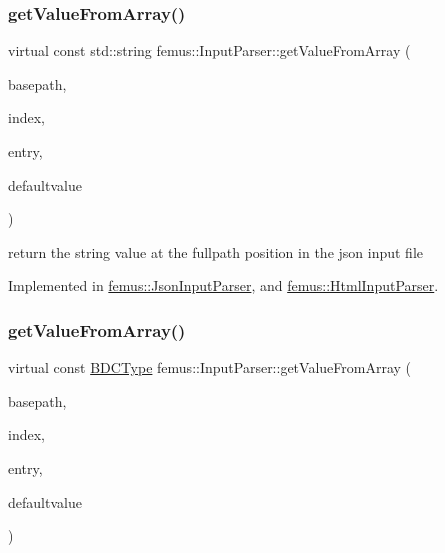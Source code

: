 \subsubsection{\texorpdfstring{get\+Value\+From\+Array()}{getValueFromArray()}\hspace{0.1cm}{\footnotesize\ttfamily [1/2]}}
{\footnotesize\ttfamily virtual const std\+::string femus\+::\+Input\+Parser\+::get\+Value\+From\+Array (\begin{DoxyParamCaption}\item[{const std\+::string \&}]{basepath,  }\item[{const unsigned int}]{index,  }\item[{const std\+::string}]{entry,  }\item[{const std\+::string}]{defaultvalue }\end{DoxyParamCaption})\hspace{0.3cm}{\ttfamily [pure virtual]}}

return the string value at the {\ttfamily fullpath} position in the json input file 

Implemented in \mbox{\hyperlink{classfemus_1_1_json_input_parser_a857a85ac2a5e12c433a143762b01d1e8}{femus\+::\+Json\+Input\+Parser}}, and \mbox{\hyperlink{classfemus_1_1_html_input_parser_a6ea19a89092720479eadfb46d38e5b7a}{femus\+::\+Html\+Input\+Parser}}.

\mbox{\label{classfemus_1_1_input_parser_a30b8407afe22e7ff56b67766cef51929}} 
\subsubsection{\texorpdfstring{get\+Value\+From\+Array()}{getValueFromArray()}\hspace{0.1cm}{\footnotesize\ttfamily [2/2]}}
{\footnotesize\ttfamily virtual const \mbox{\hyperlink{_b_d_c_type_enum_8hpp_ac1efcf28f6f152fe5354b888f616668d}{B\+D\+C\+Type}} femus\+::\+Input\+Parser\+::get\+Value\+From\+Array (\begin{DoxyParamCaption}\item[{const std\+::string \&}]{basepath,  }\item[{const unsigned int}]{index,  }\item[{const std\+::string}]{entry,  }\item[{const \mbox{\hyperlink{_b_d_c_type_enum_8hpp_ac1efcf28f6f152fe5354b888f616668d}{B\+D\+C\+Type}}}]{defaultvalue }\end{DoxyParamCaption})\hspace{0.3cm}{\ttfamily [pure virtual]}}

